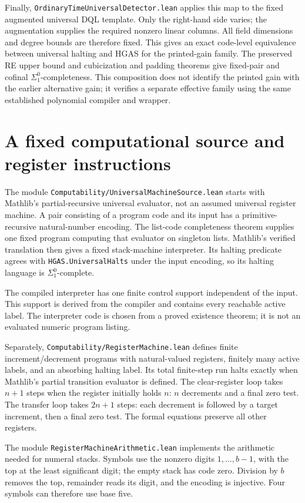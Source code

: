 \documentclass[11pt]{article}
\newcommand{\code}[1]{{\small\nolinkurl{#1}}}
\begin{document}
Finally, \code{OrdinaryTimeUniversalDetector.lean} applies this map to
the fixed augmented universal DQL template. Only the right-hand side
varies; the augmentation supplies the required nonzero linear columns.
All field dimensions and degree bounds are therefore fixed. This gives
an exact code-level equivalence between universal halting and HGAS for
the printed-gain family. The preserved RE upper bound and cubicization
and padding theorems give fixed-pair and cofinal
$\Sigma^0_1$-completeness. This composition does not identify the printed
gain with the earlier alternative gain; it verifies a separate effective
family using the same established polynomial compiler and wrapper.

\section{A fixed computational source and register instructions}

The module \code{Computability/UniversalMachineSource.lean} starts with
Mathlib's partial-recursive universal evaluator, not an assumed universal
register machine. A pair consisting of a program code and its input has
a primitive-recursive natural-number encoding. The list-code completeness
theorem supplies one fixed program computing that evaluator on singleton
lists. Mathlib's verified translation then gives a fixed stack-machine
interpreter. Its halting predicate agrees with \code{HGAS.UniversalHalts}
under the input encoding, so its halting language is $\Sigma^0_1$-complete.

The compiled interpreter has one finite control support independent of
the input. This support is derived from the compiler and contains every
reachable active label. The interpreter code is chosen from a proved
existence theorem; it is not an evaluated numeric program listing.

Separately, \code{Computability/RegisterMachine.lean} defines finite
increment/decrement programs with natural-valued registers, finitely many
active labels, and an absorbing halting label. Its total finite-step run
halts exactly when Mathlib's partial transition evaluator is defined.
The clear-register loop takes $n+1$ steps when the register initially holds
$n$: $n$ decrements and a final zero test. The transfer loop takes $2n+1$
steps: each decrement is followed by a target increment, then a final
zero test. The formal equations preserve all other registers.

The module \code{RegisterMachineArithmetic.lean} implements the arithmetic
needed for numeral stacks. Symbols use the nonzero digits $1,\ldots,b-1$,
with the top at the least significant digit; the empty stack has code
zero. Division by $b$ removes the top, remainder reads its digit, and the
encoding is injective. Four symbols can therefore use base five.
\end{document}
